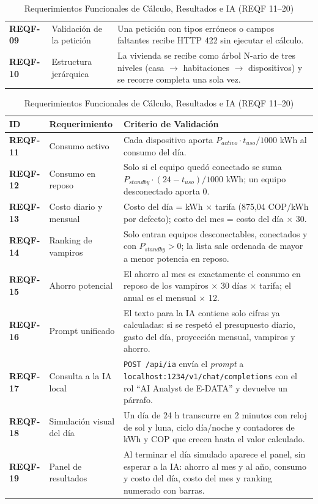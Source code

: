 \documentclass[10pt,journal,compsoc]{IEEEtran}
\begin{document}
\begin{table}[p]
\begin{tabularx}{\textwidth}{@{}l l X@{}}
\textbf{REQF-09} & Validación de la petición & Una petición con tipos erróneos o campos faltantes recibe HTTP 422 sin ejecutar el cálculo. \\
\textbf{REQF-10} & Estructura jerárquica & La vivienda se recibe como árbol N-ario de tres niveles (casa $\rightarrow$ habitaciones $\rightarrow$ dispositivos) y se recorre completa una sola vez. \\
\bottomrule
\end{tabularx}
\vspace{0.9em}
\caption{Requerimientos Funcionales de Cálculo, Resultados e IA (REQF 11--20)}
\label{tab:reqf2}
\begin{tabularx}{\textwidth}{@{}l l X@{}}
\toprule
\textbf{ID} & \textbf{Requerimiento} & \textbf{Criterio de Validación} \\
\midrule
\textbf{REQF-11} & Consumo activo & Cada dispositivo aporta $P_{activo}\cdot t_{uso}/1000$ kWh al consumo del día. \\
\textbf{REQF-12} & Consumo en reposo & Solo si el equipo quedó conectado se suma $P_{standby}\cdot(24-t_{uso})/1000$ kWh; un equipo desconectado aporta 0. \\
\textbf{REQF-13} & Costo diario y mensual & Costo del día = kWh $\times$ tarifa (875,04 COP/kWh por defecto); costo del mes = costo del día $\times$ 30. \\
\textbf{REQF-14} & Ranking de vampiros & Solo entran equipos desconectables, conectados y con $P_{standby}>0$; la lista sale ordenada de mayor a menor potencia en reposo. \\
\textbf{REQF-15} & Ahorro potencial & El ahorro al mes es exactamente el consumo en reposo de los vampiros $\times$ 30 días $\times$ tarifa; el anual es el mensual $\times$ 12. \\
\textbf{REQF-16} & Prompt unificado & El texto para la IA contiene solo cifras ya calculadas: si se respetó el presupuesto diario, gasto del día, proyección mensual, vampiros y ahorro. \\
\textbf{REQF-17} & Consulta a la IA local & \texttt{POST /api/ia} envía el \emph{prompt} a \texttt{localhost:1234/v1/chat/completions} con el rol ``AI Analyst de E-DATA'' y devuelve un párrafo. \\
\textbf{REQF-18} & Simulación visual del día & Un día de 24 h transcurre en 2 minutos con reloj de sol y luna, ciclo día/noche y contadores de kWh y COP que crecen hasta el valor calculado. \\
\textbf{REQF-19} & Panel de resultados & Al terminar el día simulado aparece el panel, sin esperar a la IA: ahorro al mes y al año, consumo y costo del día, costo del mes y ranking numerado con barras. \\

\end{tabularx}
\end{table}
\end{document}
